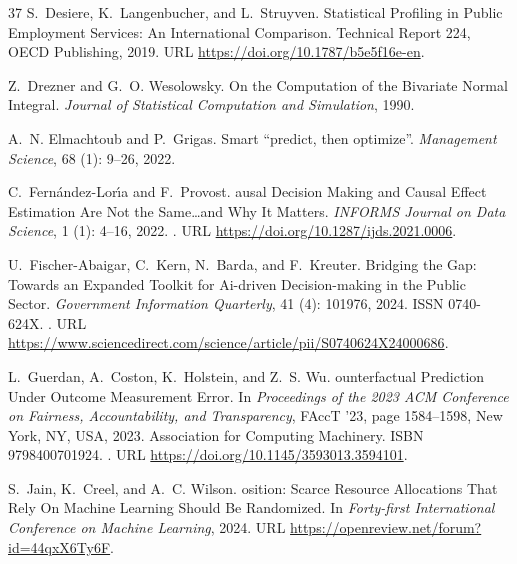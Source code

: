 \documentclass{article} %
\begin{document}
\begin{thebibliography}{37}
S.~Desiere, K.~Langenbucher, and L.~Struyven.
\newblock Statistical {P}rofiling in {P}ublic {E}mployment {S}ervices: An {I}nternational {C}omparison.
\newblock Technical Report 224, OECD Publishing, 2019.
\newblock URL \url{https://doi.org/10.1787/b5e5f16e-en}.

Z.~Drezner and G.~O. Wesolowsky.
\newblock On the {C}omputation of the {B}ivariate {N}ormal {I}ntegral.
\newblock \emph{Journal of Statistical Computation and Simulation}, 1990.

A.~N. Elmachtoub and P.~Grigas.
\newblock Smart “predict, then optimize”.
\newblock \emph{Management Science}, 68 (1): 9--26, 2022.

C.~Fern\'{a}ndez-Lor\'{\i}a and F.~Provost.
ausal {D}ecision {M}aking and {C}ausal {E}ffect {E}stimation {A}re {N}ot the {S}ame…and {W}hy {I}t {M}atters.
\newblock \emph{INFORMS Journal on Data Science}, 1 (1): 4--16, 2022.
\newblock {}.
\newblock URL \url{https://doi.org/10.1287/ijds.2021.0006}.

U.~Fischer-Abaigar, C.~Kern, N.~Barda, and F.~Kreuter.
\newblock Bridging the {G}ap: Towards an {E}xpanded {T}oolkit for {A}i-driven {D}ecision-making in the {P}ublic {S}ector.
\newblock \emph{Government Information Quarterly}, 41 (4): 101976, 2024.
\newblock ISSN 0740-624X.
\newblock {}.
\newblock URL \url{https://www.sciencedirect.com/science/article/pii/S0740624X24000686}.

L.~Guerdan, A.~Coston, K.~Holstein, and Z.~S. Wu.
ounterfactual {P}rediction {U}nder {O}utcome {M}easurement {E}rror.
\newblock In \emph{Proceedings of the 2023 ACM Conference on Fairness, Accountability, and Transparency}, FAccT '23, page 1584–1598, New York, NY, USA, 2023. Association for Computing Machinery.
\newblock ISBN 9798400701924.
\newblock {}.
\newblock URL \url{https://doi.org/10.1145/3593013.3594101}.

S.~Jain, K.~Creel, and A.~C. Wilson.
osition: {S}carce {R}esource {A}llocations {T}hat {R}ely {O}n {M}achine {L}earning {S}hould {B}e {R}andomized.
\newblock In \emph{Forty-first International Conference on Machine Learning}, 2024.
\newblock URL \url{https://openreview.net/forum?id=44qxX6Ty6F}.


\end{thebibliography}
\end{document}
